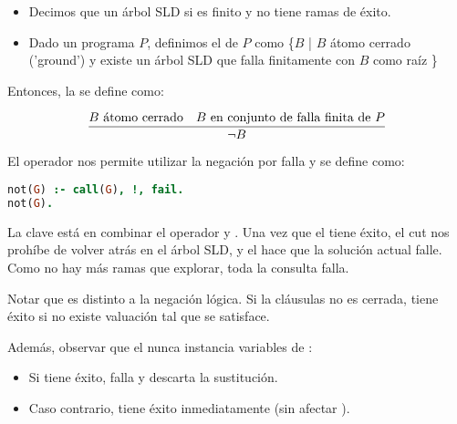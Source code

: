 \begin{itemize}
  \item Decimos que un árbol SLD  si es finito y no tiene ramas de éxito.
  \item Dado un programa $P$, definimos el  de $P$ como \{$B$ | $B$ átomo cerrado ('ground') y existe un árbol SLD que falla finitamente con  $B$ como raíz \}
\end{itemize}

Entonces, la  se define como:

\[\frac{B \text{ átomo cerrado}\quad B \text{ en conjunto de falla finita de } P}{\lnot B}\]

El operador  nos permite utilizar la negación por falla y se define como:

\begin{lstlisting}[language=Prolog]
not(G) :- call(G), !, fail.
not(G).
\end{lstlisting}

La clave está en combinar el operador \xtt{!} y . Una vez que el  tiene éxito, el cut nos prohíbe de volver atrás en el árbol SLD, y el  hace que la solución actual falle. Como no hay más ramas que explorar, toda la consulta falla.

Notar que es distinto a la negación lógica. Si la cláusulas no es cerrada,  tiene éxito si no existe  valuación tal que  se satisface.

Además, observar que el  nunca instancia variables de :
\begin{itemize}
  \item Si  tiene éxito,  falla y descarta la sustitución.
  \item Caso contrario,  tiene éxito inmediatamente (sin afectar ).
\end{itemize}
